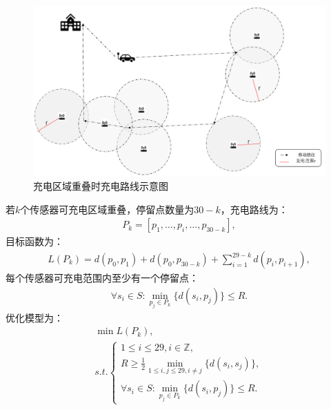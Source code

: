\documentclass{whutmod}
\begin{document}
                \begin{figure}[H]
                    \centering
                    \includegraphics[width=.8\textwidth]{figures/fugai.png}
                    \caption{充电区域重叠时充电路线示意图}\label{ngf}
                \end{figure}

                若$k$个传感器可充电区域重叠，停留点数量为$30-k$，充电路线为：
                \begin{gather}
                    P_k = [p_1, \dots, p_i, \dots, p_{30-k}],
                \end{gather}
                目标函数为：
                \begin{gather}
                    L(P_k) = d(p_0, p_1) + d(p_0, p_{30-k}) + \sum_{i=1}^{29-k} d(p_i, p_{i+1}),
                \end{gather}
                每个传感器可充电范围内至少有一个停留点：
                \begin{gather}
                    \forall s_i \in S: \min_{p_j \in P_k} \{ d(s_i, p_j) \} \leqslant R.
                \end{gather}
                优化模型为：
                \begin{gather}
                    \min L(P_k), \\
                    s.t. \left\{
                    \begin{matrix}
                        1 \leqslant i \leqslant 29, i \in \mathbb{Z}, \\
                        R \geqslant \frac{1}{2} \min_{1 \leqslant i, j \leqslant 29, i \neq j} \{ d(s_i, s_j) \}, \\
                        \forall s_i \in S: \min_{p_j \in P_k} \{ d(s_i, p_j) \} \leqslant R.
                    \end{matrix}
                    \right.
                \end{gather}
\end{document}
